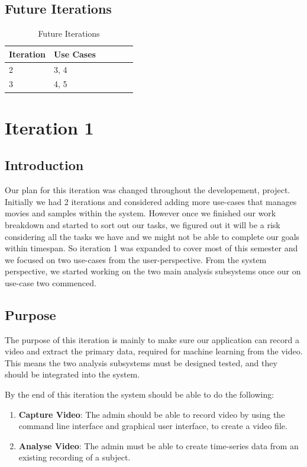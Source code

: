 \documentclass[12pt,a4paper,man]{report}
\begin{document}
\section{Future Iterations}
\label{sec:orgf975645}

\begin{table}[htbp]
\caption{\label{table:fuiterplan}
Future Iterations}
\centering
\begin{tabular}{|l|l|l|l|lp{3cm}|}
\hline
\textbf{Iteration} & \textbf{Use Cases} \footnotemark\\
\hline
2 & 3, 4\\
3 & 4, 5\\
\hline
\end{tabular}
\end{table}


\chapter{Iteration 1}
\label{sec:org8da638c}
\section{Introduction}
\label{sec:org7b023dd}
Our plan for this iteration was changed throughout the developement, project. Initially we had 2 iterations and considered adding more use-cases that manages movies and samples within the system. However once we finished our work breakdown and started to sort out our tasks, we figured out it will be a risk considering all the tasks we have and we might not be able to complete our goals within timespan. So iteration 1 was expanded to cover most of this semester and we focused on two use-cases from the user-perspective. From the system perspective, we started working on the two main analysis subsystems once our on use-case two commenced.


\section{Purpose}
\label{sec:orgf37178f}
The purpose of this iteration is mainly to make sure our application can record a video and extract the primary data, required for machine learning from the video. This means the two analysis subsystems must be designed tested, and they should be integrated into the system.

By the end of this iteration the system should be able to do the following:
\begin{enumerate}
\item \textbf{Capture Video}: The admin should be able to record video by using the command line interface and graphical user interface, to create a video file.
\item \textbf{Analyse Video}: The admin must be able to create time-series data from an existing recording of a subject.
\end{enumerate}
\end{document}
